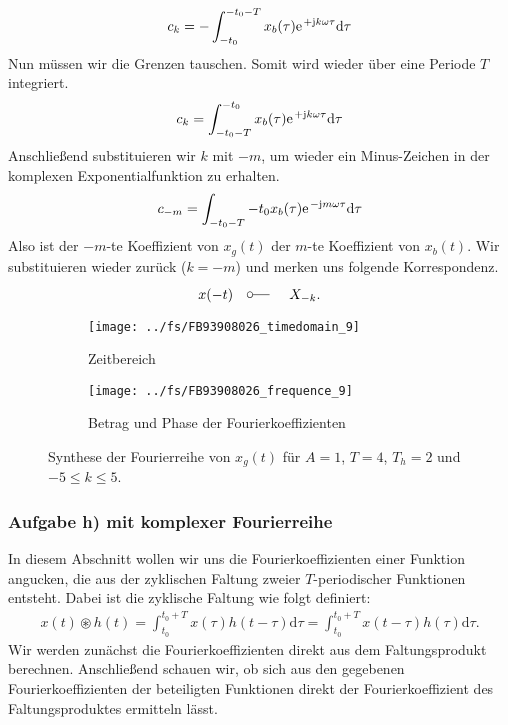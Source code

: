 \documentclass[11pt,a4paper,DIV=12]{scrartcl}
\newcommand{\diff}{\mathrm{d}}
\begin{document}
%
\begin{align}
	c_k=-\int_{-t_0}^{-t_0-T}x_{b}(\tau)\e^{+\im k \omega \tau}\diff \tau
\end{align}
%
Nun müssen wir die Grenzen tauschen. Somit wird wieder über eine Periode $T$
integriert.
%
\begin{align}
	c_k=\int_{-t_0-T}^{-t_0}x_{b}(\tau)\e^{+\im k \omega \tau}\diff \tau
\end{align}
%
Anschließend substituieren wir $k$ mit $-m$, um wieder ein Minus-Zeichen in der
komplexen Exponentialfunktion zu erhalten.
%
\begin{align}
	c_{-m}=\int_{-t_0-T}{-t_0}x_{b}(\tau)\e^{-\im m \omega \tau}\diff \tau
\end{align}
%
Also ist der $-m$-te Koeffizient von $x_{g}(t)$ der $m$-te Koeffizient von
$x_{b}(t)$.
%
Wir substituieren wieder zurück ($k=-m$) und merken uns folgende Korrespondenz.
\begin{align}
	x(-t)\quad\fourier\quad X_{-k}.
\end{align}
\begin{figure}
	\centering
	\begin{subfigure}{\textwidth}
		\texttt{[image: ../fs/FB93908026\_timedomain\_9]}
		\caption{Zeitbereich}
	\end{subfigure}
	\begin{subfigure}{\textwidth}
		\texttt{[image: ../fs/FB93908026\_frequence\_9]}
		\caption{Betrag und Phase der Fourierkoeffizienten}
	\end{subfigure}
	\caption{Synthese der Fourierreihe von $x_g(t)$ für $A=1$, $T=4$, $T_h=2$ und
		$-5\leq k\leq5$.}
\end{figure}
\newpage
\subsubsection*{Aufgabe h) mit komplexer Fourierreihe}
In diesem Abschnitt wollen wir uns die Fourierkoeffizienten einer Funktion
angucken, die aus der zyklischen Faltung zweier $T$-periodischer Funktionen
entsteht.
%
Dabei ist die zyklische Faltung wie folgt definiert:
%
\begin{align}
	x(t)\circledast h(t)=\int_{t_0}^{t_0+T}x(\tau)h(t-\tau)\diff \tau=\int_{t_0}^{t_0+T}x(t-\tau)h(\tau)\diff \tau.
\end{align}
%
Wir werden zunächst die Fourierkoeffizienten direkt aus dem Faltungsprodukt
berechnen.
%
Anschließend schauen wir, ob sich aus den gegebenen Fourierkoeffizienten der
beteiligten Funktionen direkt der Fourierkoeffizient des Faltungsproduktes
ermitteln lässt.
\end{document}
